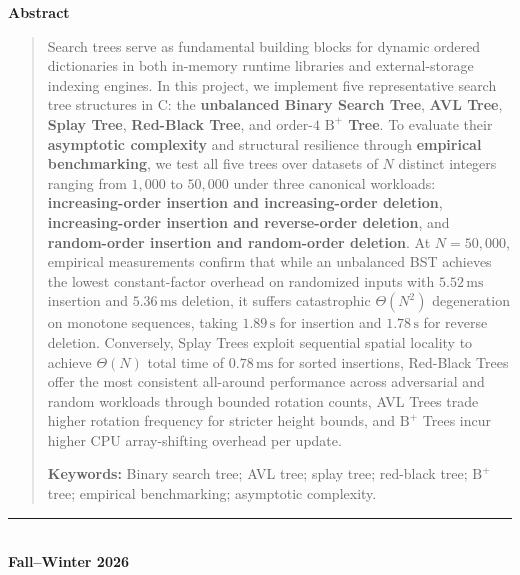 \documentclass[10pt, a4paper]{article}
\begin{document}
\begin{titlepage}
\vspace{0.8cm}
\begin{center}
    {\large\bfseries\color{primary} Abstract}
\end{center}
\vspace{-0.2em}
\begin{quote}
\small\noindent
Search trees serve as fundamental building blocks for dynamic ordered dictionaries in both in-memory runtime libraries and external-storage indexing engines. In this project, we implement five representative search tree structures in C: the \textbf{unbalanced Binary Search Tree}, \textbf{AVL Tree}, \textbf{Splay Tree}, \textbf{Red-Black Tree}, and order-$4$ \textbf{$\text{B}^+$ Tree}. To evaluate their \textbf{asymptotic complexity} and structural resilience through \textbf{empirical benchmarking}, we test all five trees over datasets of $N$ distinct integers ranging from $1{,}000$ to $50{,}000$ under three canonical workloads: \textbf{increasing-order insertion and increasing-order deletion}, \textbf{increasing-order insertion and reverse-order deletion}, and \textbf{random-order insertion and random-order deletion}. At $N=50{,}000$, empirical measurements confirm that while an unbalanced BST achieves the lowest constant-factor overhead on randomized inputs with $5.52\,\text{ms}$ insertion and $5.36\,\text{ms}$ deletion, it suffers catastrophic $\Theta(N^2)$ degeneration on monotone sequences, taking $1.89\,\text{s}$ for insertion and $1.78\,\text{s}$ for reverse deletion. Conversely, Splay Trees exploit sequential spatial locality to achieve $\Theta(N)$ total time of $0.78\,\text{ms}$ for sorted insertions, Red-Black Trees offer the most consistent all-around performance across adversarial and random workloads through bounded rotation counts, AVL Trees trade higher rotation frequency for stricter height bounds, and $\text{B}^+$ Trees incur higher CPU array-shifting overhead per update.

\vspace{0.55em}\noindent
{\color{primary}\textbf{Keywords:}} Binary search tree; AVL tree; splay tree; red-black tree; $\text{B}^+$ tree; empirical benchmarking; asymptotic complexity.
\end{quote}

\vfill
\begin{center}
    {\color{accent!80}\rule{0.14\textwidth}{0.8pt}}\\[0.25cm]
    {\normalsize\bfseries\color{primary} Fall--Winter 2026}
\end{center}
\end{titlepage}
\end{document}
